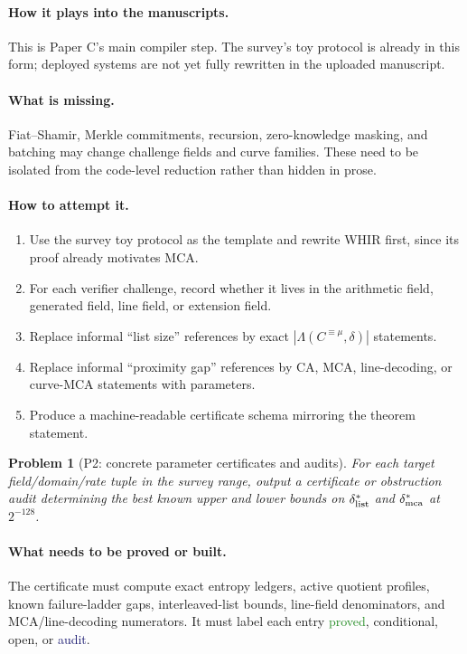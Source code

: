 \documentclass[11pt]{article}
\newtheorem{problem}[theorem]{Problem}
\theoremstyle{definition}
\theoremstyle{remark}
\newcommand{\Int}[2]{#1^{\equiv #2}}
\newcommand{\statusproved}{\textcolor{ForestGreen}{proved}}
\newcommand{\statuscond}{\textcolor{BurntOrange}{conditional}}
\newcommand{\statusopen}{\textcolor{BrickRed}{open}}
\newcommand{\statusaudit}{\textcolor{MidnightBlue}{audit}}
\newcommand{\paperC}{Paper C}
\begin{document}
\paragraph{How it plays into the manuscripts.}  This is \paperC's main compiler step.  The survey's toy protocol is already in this form; deployed systems are not yet fully rewritten in the uploaded manuscript.

\paragraph{What is missing.}  Fiat--Shamir, Merkle commitments, recursion, zero-knowledge masking, and batching may change challenge fields and curve families.  These need to be isolated from the code-level reduction rather than hidden in prose.

\paragraph{How to attempt it.}
\begin{enumerate}[leftmargin=2.2em]
\item Use the survey toy protocol as the template and rewrite WHIR \cite{ACFY25} first, since its proof already motivates MCA.
\item For each verifier challenge, record whether it lives in the arithmetic field, generated field, line field, or extension field.
\item Replace informal ``list size'' references by exact $|\Lambda(\Int{C}{\mu},\delta)|$ statements.
\item Replace informal ``proximity gap'' references by CA, MCA, line-decoding, or curve-MCA statements with parameters.
\item Produce a machine-readable certificate schema mirroring the theorem statement.
\end{enumerate}

\begin{problem}[P2: concrete parameter certificates and audits]
\label{prob:P2}
For each target field/domain/rate tuple in the survey range, output a certificate or obstruction audit determining the best known upper and lower bounds on $\delta^*_{\rm list}$ and $\delta^*_{\rm mca}$ at $2^{-128}$.
\end{problem}

\paragraph{What needs to be proved or built.}  The certificate must compute exact entropy ledgers, active quotient profiles, known failure-ladder gaps, interleaved-list bounds, line-field denominators, and MCA/line-decoding numerators.  It must label each entry \statusproved, \statuscond, \statusopen, or \statusaudit.
\end{document}
